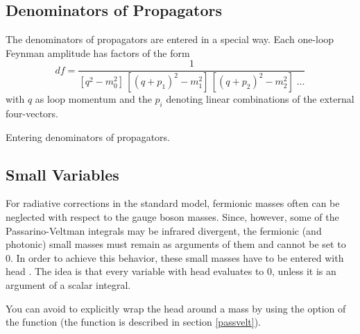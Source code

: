 \subsection{Denominators of Propagators}
The denominators of propagators are entered in a special way.
Each one-loop Feynman amplitude has factors of the form
$$
df = \frac {1}{[q^{2}-m_{0}^{2}]\, [(q+p_{1})^{2}-m_{1}^{2}] \,
             [(q+p_{2})^{2}-m_{2}^{2}] \; \ldots
                     }
$$
with $q$ as loop momentum and the $p_{i}$ denoting linear combinations of the
external four-vectors.

 {Entering denominators of propagators.}

\beom
{}
\enom

\beom
{}
\enom

\subsection{Small Variables}

For radiative corrections in the standard model, fermionic masses
often can be neglected with respect to the gauge boson masses.
Since, however, some of the Passarino-Veltman integrals may be infrared divergent,
the fermionic (and photonic) small masses must remain as
arguments of them and cannot be set to 0.
In order to achieve this behavior, these small masses have to be
entered with  head .
The idea is that every variable with head  evaluates
to $0$, unless it is an argument of a scalar integral.

You can avoid to explicitly wrap the head  around a mass by
using the option  of the function 
(the function  is described in section \ref{passvelt}).

